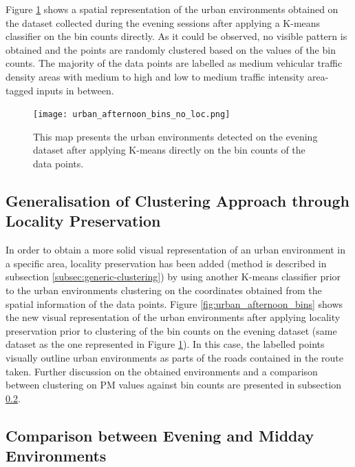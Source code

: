\documentclass[bsc,frontabs,twoside,singlespacing, parskip,deptreport]{infthesis}     %
\begin{document}
Figure \ref{fig:urban_afternoon_bins_no_loc.png} shows a spatial representation of the urban environments obtained on the dataset collected during the evening sessions after applying a K-means classifier on the bin counts directly. As it could be observed, no visible pattern is obtained and the points are randomly clustered based on the values of the bin counts. The majority of the data points are labelled as medium vehicular traffic density areas with medium to high and low to medium traffic intensity area-tagged inputs in between.

\begin{figure}[h!]
  \center
  \texttt{[image: urban\_afternoon\_bins\_no\_loc.png]}
  \caption{This map presents the urban environments detected on the evening dataset after applying K-means directly on the bin counts of the data points.}
  \label{fig:urban_afternoon_bins_no_loc.png}
\end{figure}


\subsection{Generalisation of Clustering Approach through Locality Preservation}
\label{subsec:locality-preservation-results}

In order to obtain a more solid visual representation of an urban environment in a specific area, locality preservation has been added (method is described in subsection \ref{subsec:generic-clustering}) by using another K-means classifier prior to the urban environments clustering on the coordinates obtained from the spatial information of the data points. Figure \ref{fig:urban_afternoon_bins} shows the new visual representation of the urban environments after applying locality preservation prior to clustering of the bin counts on the evening dataset (same dataset as the one represented in Figure \ref{fig:urban_afternoon_bins_no_loc.png}). In this case, the labelled points visually outline urban environments as parts of the roads contained in the route taken. Further discussion on the obtained environments and a comparison between clustering on PM values against bin counts are presented in subsection \ref{subsec:afternoon-midday-results}.


\subsection{Comparison between Evening and Midday Environments}
\label{subsec:afternoon-midday-results}
\end{document}
